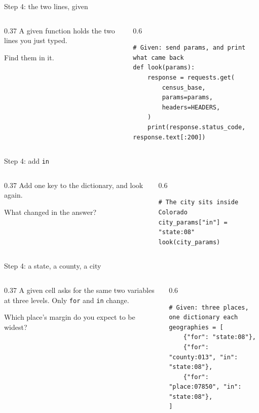 \documentclass[9pt,aspectratio=169]{beamer}
\begin{document}
\begin{frame}[fragile]{Step 4: the two lines, given}
    \begin{columns}[T]
        \begin{column}{0.37\textwidth}
            A given function holds the two lines you just typed.

            \medskip
            Find them in it.
        \end{column}
        \begin{column}{0.6\textwidth}
\begin{lstlisting}
# Given: send params, and print what came back
def look(params):
    response = requests.get(
        census_base,
        params=params,
        headers=HEADERS,
    )
    print(response.status_code, response.text[:200])
\end{lstlisting}
        \end{column}
    \end{columns}
\end{frame}

\begin{frame}[fragile]{Step 4: add \texttt{in}}
    \begin{columns}[T]
        \begin{column}{0.37\textwidth}
            Add one key to the dictionary, and look again.

            \medskip
            What changed in the answer?
        \end{column}
        \begin{column}{0.6\textwidth}
\begin{lstlisting}
# The city sits inside Colorado
city_params["in"] = "state:08"
look(city_params)
\end{lstlisting}
        \end{column}
    \end{columns}
\end{frame}

\begin{frame}[fragile]{Step 4: a state, a county, a city}
    \begin{columns}[T]
        \begin{column}{0.37\textwidth}
            A given cell asks for the same two variables at three levels. Only \texttt{for} and \texttt{in} change.

            \medskip
            Which place's margin do you expect to be widest?
        \end{column}
        \begin{column}{0.6\textwidth}
\begin{lstlisting}
# Given: three places, one dictionary each
geographies = [
    {"for": "state:08"},
    {"for": "county:013", "in": "state:08"},
    {"for": "place:07850", "in": "state:08"},
]
\end{lstlisting}
        \end{column}
    \end{columns}
\end{frame}
\end{document}
